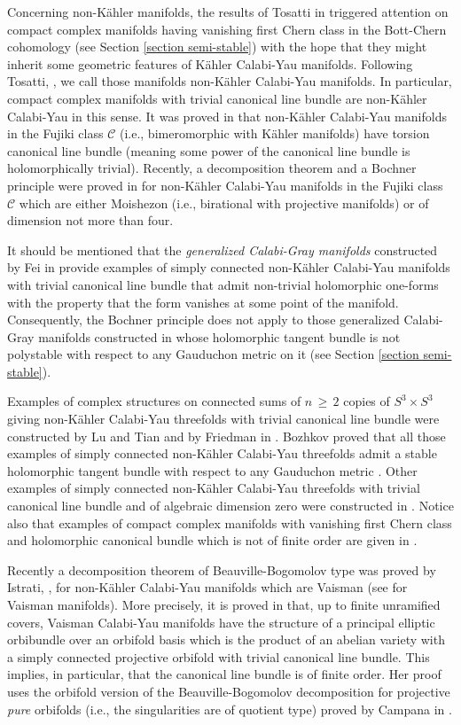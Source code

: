 \documentclass[12pt,reqno]{amsart}
\theoremstyle{definition}
\numberwithin{equation}{section}
\begin{document}
Concerning non-K\"ahler manifolds, the results of Tosatti in \cite{To} triggered attention on compact 
complex manifolds having vanishing first Chern class in the Bott-Chern cohomology (see Section \ref{section 
semi-stable}) with the hope that they might inherit some geometric features of K\"ahler Calabi-Yau 
manifolds. Following Tosatti, \cite{To}, we call those manifolds non-K\"ahler Calabi-Yau manifolds. In 
particular, compact complex manifolds with trivial canonical line bundle are non-K\"ahler Calabi-Yau in 
this sense. It was proved in \cite{To} that non-K\"ahler Calabi-Yau manifolds in the Fujiki class 
$\mathcal C$ (i.e., bimeromorphic with K\"ahler manifolds) have torsion canonical line bundle (meaning
some power of the canonical line bundle is holomorphically trivial). 
Recently, a decomposition theorem and a Bochner principle were proved in \cite{BCDG} for 
non-K\"ahler Calabi-Yau manifolds in the Fujiki class $\mathcal C$ which are either Moishezon (i.e.,
birational with projective manifolds) or of dimension not more than four.

It should be mentioned that the {\it generalized Calabi-Gray manifolds} constructed by Fei in \cite{Fe} 
provide examples of simply connected non-K\"ahler Calabi-Yau manifolds with trivial canonical line bundle 
that admit non-trivial holomorphic one-forms with the property that the form vanishes at some point of the 
manifold. Consequently, the Bochner principle does not apply to those generalized Calabi-Gray manifolds 
constructed in \cite{Fe} whose holomorphic tangent bundle is not polystable with respect to any Gauduchon 
metric on it (see Section \ref{section semi-stable}).

Examples of complex structures on connected sums of $n \,\geq\, 2$ copies of $S^3 \times S^3$ giving 
non-K\"ahler Calabi-Yau threefolds with trivial canonical line bundle were constructed by Lu and Tian and 
by Friedman in \cite{Fr,LT1,LT2}. Bozhkov proved that all those examples of simply connected non-K\"ahler 
Calabi-Yau threefolds admit a stable holomorphic tangent bundle with respect to any Gauduchon metric 
\cite{Boz}. Other examples of simply connected non-K\"ahler Calabi-Yau threefolds with trivial canonical 
line bundle and of algebraic dimension zero were constructed in \cite{FP}. Notice also that examples of 
compact complex manifolds with vanishing first Chern class and holomorphic canonical bundle which is not of finite order are given in \cite{Ro}.

Recently a decomposition theorem of Beauville-Bogomolov type was proved by Istrati, \cite{Is}, for 
non-K\"ahler Calabi-Yau manifolds which are Vaisman (see \cite{Va1,Va2} for Vaisman manifolds). More 
precisely, it is proved in \cite[Theorem D]{Is} that, up to finite unramified covers, Vaisman Calabi-Yau manifolds have the structure of a principal 
elliptic orbibundle over an orbifold basis which is the product of an abelian variety with a simply 
connected projective orbifold with trivial canonical line bundle. This implies, in particular, that the canonical line 
bundle is of finite order. Her proof uses the orbifold version of the Beauville-Bogomolov decomposition for 
projective {\it pure} orbifolds (i.e., the singularities are of quotient type) proved by Campana in \cite{Ca}.
\end{document}
